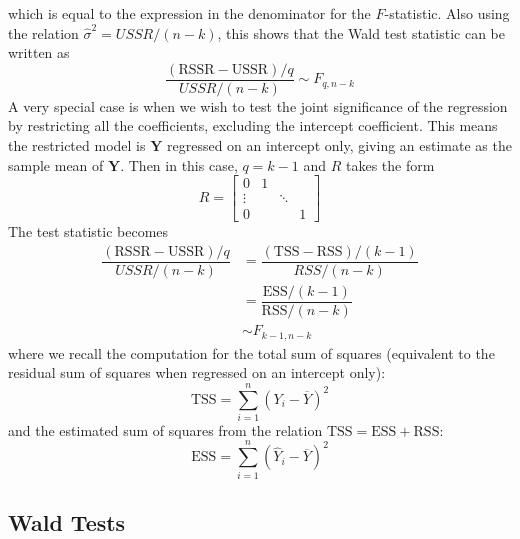 \documentclass[11pt]{report} %
\begin{document}
which is equal to the expression in the denominator for the $F$-statistic. Also using the relation $\widehat{\sigma}^{2} = USSR/\left(n - k\right)$, this shows that the Wald test statistic can be written as
\begin{equation}
\dfrac{\left(\mathrm{RSSR} - \mathrm{USSR}\right)/q}{USSR/\left(n - k\right)} \sim F_{q, n- k}
\end{equation}
A very special case is when we wish to test the joint significance of the regression by restricting all the coefficients, excluding the intercept coefficient. This means the restricted model is $\mathbf{Y}$ regressed on an intercept only, giving an estimate as the sample mean of $\mathbf{Y}$. Then in this case, $q = k - 1$ and $R$ takes the form
\begin{equation}
R = \begin{bmatrix}
0 & 1 &  \\
\vdots &  & \ddots \\
0 & & & 1
\end{bmatrix}
\end{equation}
The test statistic becomes
\begin{align}
\dfrac{\left(\mathrm{RSSR} - \mathrm{USSR}\right)/q}{USSR/\left(n - k\right)} &= \dfrac{\left(\mathrm{TSS} - \mathrm{RSS}\right)/\left(k - 1\right)}{RSS/\left(n - k\right)} \\
&= \dfrac{\mathrm{ESS}/\left(k - 1\right)}{\mathrm{RSS}/\left(n - k\right)} \\
&\sim F_{k - 1, n- k}
\end{align}
where we recall the computation for the total sum of squares (equivalent to the residual sum of squares when regressed on an intercept only):
\begin{equation}
\mathrm{TSS} = \sum_{i = 1}^{n}\left(Y_{i} - \overline{Y}\right)^{2}
\end{equation}
and the estimated sum of squares from the relation $\mathrm{TSS} = \mathrm{ESS} + \mathrm{RSS}$:
\begin{equation}
\mathrm{ESS} = \sum_{i = 1}^{n}\left(\widehat{Y}_{i} - \overline{Y}\right)^{2}
\end{equation}

\subsection{Wald Tests}
\end{document}
